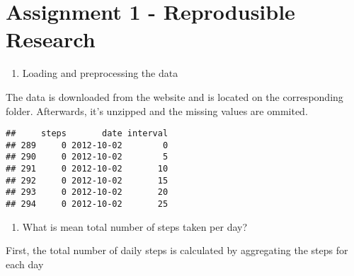 \documentclass[]{article}
\author{}
\date{\vspace{-2.5em}}
\newenvironment{Shaded}{\begin{snugshade}}{\end{snugshade}}
\newcommand{\KeywordTok}[1]{\textcolor[rgb]{0.13,0.29,0.53}{\textbf{#1}}}
\newcommand{\DataTypeTok}[1]{\textcolor[rgb]{0.13,0.29,0.53}{#1}}
\newcommand{\StringTok}[1]{\textcolor[rgb]{0.31,0.60,0.02}{#1}}
\newcommand{\OtherTok}[1]{\textcolor[rgb]{0.56,0.35,0.01}{#1}}
\newcommand{\ControlFlowTok}[1]{\textcolor[rgb]{0.13,0.29,0.53}{\textbf{#1}}}
\newcommand{\OperatorTok}[1]{\textcolor[rgb]{0.81,0.36,0.00}{\textbf{#1}}}
\newcommand{\NormalTok}[1]{#1}
\providecommand{\tightlist}{%
  \setlength{\itemsep}{0pt}\setlength{\parskip}{0pt}}
\begin{document}
\section{Assignment 1 - Reprodusible
Research}\label{assignment-1---reprodusible-research}

\begin{enumerate}
\def\labelenumi{\arabic{enumi})}
\tightlist
\item
  Loading and preprocessing the data
\end{enumerate}

The data is downloaded from the website and is located on the
corresponding folder. Afterwards, it's unzipped and the missing values
are ommited.

\begin{Shaded}
\end{Shaded}

\begin{verbatim}
##     steps       date interval
## 289     0 2012-10-02        0
## 290     0 2012-10-02        5
## 291     0 2012-10-02       10
## 292     0 2012-10-02       15
## 293     0 2012-10-02       20
## 294     0 2012-10-02       25
\end{verbatim}

\begin{enumerate}
\def\labelenumi{\arabic{enumi})}
\setcounter{enumi}{1}
\tightlist
\item
  What is mean total number of steps taken per day?
\end{enumerate}

First, the total number of daily steps is calculated by aggregating the
steps for each day
\end{document}
